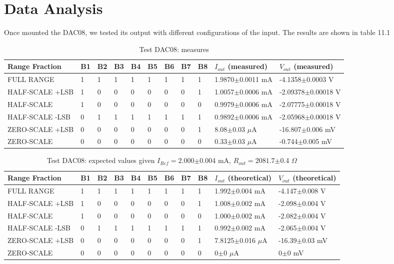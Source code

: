 \section{Data Analysis}
Once mounted the DAC08, we tested its output with different configurations of the input. The results are shown in table 11.1 \\

\begin{table}[H]
\centering
 \begin{tabular}{lllllllllll}
 \toprule
  Range Fraction & B1 & B2 & B3 & B4 & B5 & B6 & B7 & B8 & $I_{out}$ (measured) & $V_{out}$ (measured) \\
 \midrule
  FULL RANGE & 1 & 1 & 1 & 1 & 1 & 1 & 1 & 1 & 1.9870\(\pm\)0.0011 mA & -4.1358\(\pm\)0.0003 V \\
  HALF-SCALE +LSB & 1 & 0 & 0 & 0 & 0 & 0 & 0 & 1 & 1.0057\(\pm\)0.0006 mA & -2.09378\(\pm\)0.00018 V \\
  HALF-SCALE & 1 & 0 & 0 & 0 & 0 & 0 & 0 & 0 & 0.9979\(\pm\)0.0006 mA & -2.07775\(\pm\)0.00018 V \\
  HALF-SCALE  -LSB & 0 & 1 & 1 & 1 & 1 & 1 & 1 & 1 & 0.9892\(\pm\)0.0006 mA & -2.05968\(\pm\)0.00018 V \\
  ZERO-SCALE +LSB & 0 & 0 & 0 & 0 & 0 & 0 & 0 & 1 & 8.08\(\pm\)0.03 \(\mu\)A & -16.807\(\pm\)0.006 mV \\
  ZERO-SCALE & 0 & 0 & 0 & 0 & 0 & 0 & 0 & 0 & 0.33\(\pm\)0.03 \(\mu\)A & -0.744\(\pm\)0.005 mV \\
 \bottomrule
 \end{tabular}
\caption{Test DAC08: measures}
\end{table}  

\begin{table}[H]
\centering
 \begin{tabular}{lllllllllll}
 \toprule
  Range Fraction & B1 & B2 & B3 & B4 & B5 & B6 & B7 & B8 & $I_{out}$ (theoretical) & $V_{out}$ (theoretical)\\
 \midrule
  FULL RANGE & 1 & 1 & 1 & 1 & 1 & 1 & 1 & 1 & 1.992\(\pm\)0.004 mA & -4.147\(\pm\)0.008 V \\
  HALF-SCALE +LSB & 1 & 0 & 0 & 0 & 0 & 0 & 0 & 1 & 1.008\(\pm\)0.002 mA & -2.098\(\pm\)0.004 V \\
  HALF-SCALE & 1 & 0 & 0 & 0 & 0 & 0 & 0 & 0 & 1.000\(\pm\)0.002 mA & -2.082\(\pm\)0.004 V \\
  HALF-SCALE  -LSB & 0 & 1 & 1 & 1 & 1 & 1 & 1 & 1 & 0.992\(\pm\)0.002 mA & -2.065\(\pm\)0.004 V \\
  ZERO-SCALE +LSB & 0 & 0 & 0 & 0 & 0 & 0 & 0 & 1 & 7.8125\(\pm\)0.016 \(\mu\)A & -16.39\(\pm\)0.03 mV \\
  ZERO-SCALE & 0 & 0 & 0 & 0 & 0 & 0 & 0 & 0 & 0\(\pm\)0 \(\mu\)A & 0\(\pm\)0 mV \\
 \bottomrule
 \end{tabular}
\caption{Test DAC08: expected values given $I_{Ref}=2.000$\(\pm\)0.004 mA, $R_{out}=2081.7$\(\pm\)0.4 \(\Omega\)}
\end{table}  

